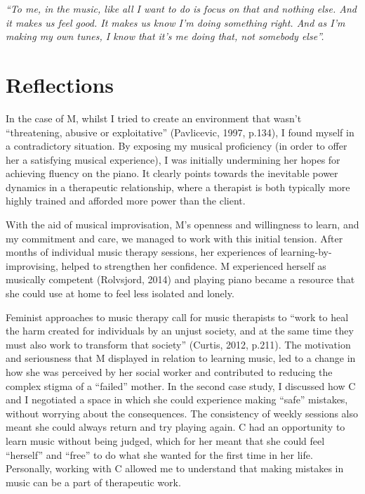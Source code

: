 \documentclass[authordate, empirical]{jote-new-article}
\begin{document}
{\emph{“To me, in the music, like all I want to do is focus on that and nothing else. And it makes us feel good. It makes us know I'm doing something right. And as I'm making my own tunes, I know that it's me doing that, not somebody else”. }}











\section{Reflections}







In the case of M, whilst I tried to create an environment that wasn't “threatening, abusive or exploitative” (Pavlicevic, 1997, p.134), I found myself in a contradictory situation. By exposing my musical proficiency (in order to offer her a satisfying musical experience), I was initially undermining her hopes for achieving fluency on the piano. It clearly points towards the inevitable power dynamics in a therapeutic relationship, where a therapist is both typically more highly trained and afforded more power than the client.







With the aid of musical improvisation, M's openness and willingness to learn, and my commitment and care, we managed to work with this initial tension. After months of individual music therapy sessions, her experiences of learning-by-improvising, helped to strengthen her confidence. M experienced herself as musically competent (Rolvsjord, 2014) and playing piano became a resource that she could use at home to feel less isolated and lonely.







Feminist approaches to music therapy call for music therapists to “work to heal the harm created for individuals by an unjust society, and at the same time they must also work to transform that society” (Curtis, 2012, p.211). The motivation and seriousness that M displayed in relation to learning music, led to a change in how she was perceived by her social worker and contributed to reducing the complex stigma of a “failed” mother. In the second case study, I discussed how C and I negotiated a space in which she could experience making “safe” mistakes, without worrying about the consequences. The consistency of weekly sessions also meant she could always return and try playing again. C had an opportunity to learn music without being judged, which for her meant that she could feel “herself” and “free” to do what she wanted for the first time in her life. Personally, working with C allowed me to understand that making mistakes in music can be a part of therapeutic work.
\end{document}
